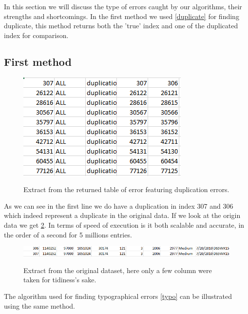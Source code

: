 \documentclass{article}
\begin{document}
In this section we will discuss the type of errors caught by our algorithms, their strengths and shortcomings.
In the first method we used \ref{duplicate} for finding duplicate, this method returns both the 'true' index and one of the duplicated index for comparison.
\subsection{First method}

\begin{figure}[H]
    \centering
    \includegraphics[scale=0.8]{picture/exp_duplicated.png}
    \label{fig:exp_duplicate}
    \caption{Extract from the returned table of error featuring duplication errors.}
\end{figure}

As we can see in the first line we do have a duplication in index 307 and 306 which indeed represent a duplicate in the original data. If we look at the origin data we get \ref{fig:exp_duplicate_db}. In terms of speed of execution is it both scalable and accurate, in the order of a second for 5 millions entries.

\begin{figure}[h]
    \centering
    \includegraphics[width=\linewidth]{picture/exp_duplicated_db.png}
    \label{fig:exp_duplicate_db}
    \caption{Extract from the original dataset, here only a few column were taken for tidiness's sake.}
\end{figure}

The algorithm used for finding typographical errors \ref{typo} can be illustrated using the same method.
\end{document}
